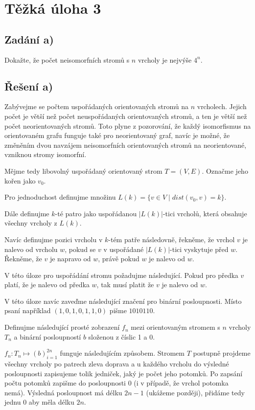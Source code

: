 \documentclass[../main.tex]{subfiles}
\begin{document}
\section{Těžká úloha 3}

\subsection{Zadání a)}
Dokažte, že počet neisomorfních stromů s $n$ vrcholy je nejvýše $4^n$.

\subsection{Řešení a)}

Zabývejme se počtem uspořádaných orientovaných stromů na $n$ vrcholech.
Jejich počet je větší než počet neuspořádaných orientovaných stromů, a ten je větší než počet neorientovaných stromů. 
Toto plyne z pozorování, že 
každý isomorfismus na orientovaném grafu funguje také pro neorientovaný 
graf, navíc je možné, 
že změněním dvou navzájem neisomorfních orientovaných stromů na neorientované, 
vzniknou stromy isomorfní. 

Mějme tedy libovolný uspořádaný orientovaný strom $T=(V,E)$. Označme jeho kořen jako $v_0$.

Pro jednoduchost definujme množinu $L(k) = \{v\in V\mid dist(v_0, v) = k \}$.

Dále definujme $k$-té patro jako uspořádanou $|L(k)|$-tici vrcholů, která obsahuje 
všechny vrcholy z $L(k)$. 

Navíc definujme pozici vrcholu v $k$-tém patře následovně, řekněme, že 
vrchol $v$ je nalevo od vrcholu $w$, pokud se $v$ v uspořádané $|L(k)|$-tici vyskytuje před $w$. 
Řekněme, že $v$ je napravo od $w$, právě pokud $w$ je nalevo od $w$.



V této úloze pro uspořádání stromu požadujme následující. 
Pokud pro předka $v$ platí, že je nalevo od předka $w$, 
tak musí platit že $v$ je nalevo od $w$.

V této úloze navíc zaveďme následující značení pro binární posloupnosti.
Místo psaní například $(1,0,1,0,1,1,0)$ pišme $1010110$.

Definujme následující prosté zobrazení $f_n$ mezi orientovaným stromem s $n$ vrcholy $T_n$ a binární posloupností $b$ složenou z číslic 1 a 0. 

$f_n: T_n\mapsto (b)_{i=1}^{2n}$ funguje následujícím způsobem. 
Stromem $T$ postupně projdeme všechny vrcholy po patrech zleva doprava a u každého vrcholu 
do výsledné posloupnosti 
zapisujeme tolik jedniček, jaký je počet jeho potomků. Po zapsání počtu potomků 
zapišme do posloupnosti 0 (i v případě, že vrchol potomka nemá). Výsledná posloupnost má délku $2n-1$ (ukážeme později), 
přidáme tedy jednu $0$ aby měla délku $2n$.
\end{document}
